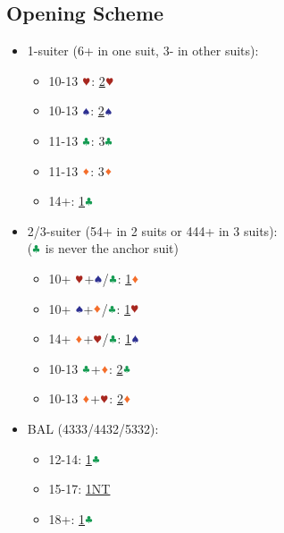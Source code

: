 \documentclass{article}
\begin{document}
\begin{multicols}{2}
\section{Opening Scheme}
\begin{itemize}
    \item 1-suiter (6+ in one suit, 3- in other suits):
    \begin{itemize}
        \item 10-13 $\hhh$: \hyperref[sec:1suit]{2$\hhh$}
        \item 10-13 $\sss$: \hyperref[sec:1suit]{2$\sss$}
        \item 11-13 $\ccc$: 3$\ccc$
        \item 11-13 $\ddd$: 3$\ddd$
        \item 14+: \hyperref[sec:1c]{1$\ccc$}
    \end{itemize}
    \item 2/3-suiter (54+ in 2 suits or 444+ in 3 suits):\\
    ($\ccc$ is never the anchor suit)
    \begin{itemize}
        \item 10+ $\hhh$+$\sss$/$\ccc$: \hyperref[sec:1d]{1$\ddd$}
        \item 10+ $\sss$+$\ddd$/$\ccc$: \hyperref[sec:1h]{1$\hhh$}
        \item 14+ $\ddd$+$\hhh$/$\ccc$: \hyperref[sec:1s]{1$\sss$}
        \item 10-13 $\ccc$+$\ddd$: \hyperref[sec:2cd]{2$\ccc$}
        \item 10-13 $\ddd$+$\hhh$: \hyperref[sec:2cd]{2$\ddd$}
    \end{itemize}
    \item BAL (4333/4432/5332):
    \begin{itemize}
        \item 12-14: \hyperref[sec:1c]{1$\ccc$}
        \item 15-17: \hyperref[sec:1n]{1NT}
        \item 18+: \hyperref[sec:1c]{1$\ccc$}
    \end{itemize}
\end{itemize}


\end{multicols}
\end{document}
